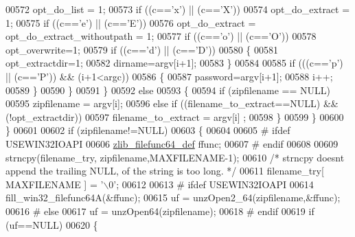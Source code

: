 \begin{DoxyCode}
{{{{{{{{{{{{{{{{{{{{00572                         opt\_do\_list = 1;
00573                     \textcolor{keywordflow}{if} ((c==\textcolor{charliteral}{'x'}) || (c==\textcolor{charliteral}{'X'}))
00574                         opt\_do\_extract = 1;
00575                     \textcolor{keywordflow}{if} ((c==\textcolor{charliteral}{'e'}) || (c==\textcolor{charliteral}{'E'}))
00576                         opt\_do\_extract = opt\_do\_extract\_withoutpath = 1;
00577                     \textcolor{keywordflow}{if} ((c==\textcolor{charliteral}{'o'}) || (c==\textcolor{charliteral}{'O'}))
00578                         opt\_overwrite=1;
00579                     \textcolor{keywordflow}{if} ((c==\textcolor{charliteral}{'d'}) || (c==\textcolor{charliteral}{'D'}))
00580                     \{
00581                         opt\_extractdir=1;
00582                         dirname=argv[i+1];
00583                     \}
00584 
00585                     \textcolor{keywordflow}{if} (((c==\textcolor{charliteral}{'p'}) || (c==\textcolor{charliteral}{'P'})) && (i+1<argc))
00586                     \{
00587                         password=argv[i+1];
00588                         i++;
00589                     \}
00590                 \}
00591             \}
00592             \textcolor{keywordflow}{else}
00593             \{
00594                 \textcolor{keywordflow}{if} (zipfilename == NULL)
00595                     zipfilename = argv[i];
00596                 \textcolor{keywordflow}{else} \textcolor{keywordflow}{if} ((filename\_to\_extract==NULL) && (!opt\_extractdir))
00597                         filename\_to\_extract = argv[i] ;
00598             \}
00599         \}
00600     \}
00601 
00602     \textcolor{keywordflow}{if} (zipfilename!=NULL)
00603     \{
00604 
00605 \textcolor{preprocessor}{#        ifdef USEWIN32IOAPI}
00606         \hyperlink{structzlib__filefunc64__def__s}{zlib\_filefunc64\_def} ffunc;
00607 \textcolor{preprocessor}{#        endif}
00608 
00609         strncpy(filename\_try, zipfilename,MAXFILENAME-1);
00610         \textcolor{comment}{/* strncpy doesnt append the trailing NULL, of the string is too long. */}
00611         filename\_try[ MAXFILENAME ] = \textcolor{charliteral}{'\(\backslash\)0'};
00612 
00613 \textcolor{preprocessor}{#        ifdef USEWIN32IOAPI}
00614         fill\_win32\_filefunc64A(&ffunc);
00615         uf = unzOpen2\_64(zipfilename,&ffunc);
00616 \textcolor{preprocessor}{#        else}
00617         uf = unzOpen64(zipfilename);
00618 \textcolor{preprocessor}{#        endif}
00619         \textcolor{keywordflow}{if} (uf==NULL)
00620         \{
}}}}}}}}}}}}}}}}}}}}
\end{DoxyCode}
